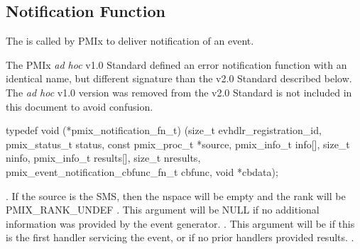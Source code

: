 \subsection{Notification Function}

\summary

The  is called by \ac{PMIx} to deliver notification of an event.

\adviceuserstart
The \ac{PMIx} \textit{ad hoc} v1.0 Standard defined an error notification function with an identical name, but different signature than the v2.0 Standard described below. The \textit{ad hoc} v1.0 version was removed from the v2.0 Standard is not included in this document to avoid confusion.
\adviceuserend


\cspecificstart
\begin{codepar}
typedef void (*pmix_notification_fn_t)
    (size_t evhdlr_registration_id,
     pmix_status_t status,
     const pmix_proc_t *source,
     pmix_info_t info[], size_t ninfo,
     pmix_info_t results[], size_t nresults,
     pmix_event_notification_cbfunc_fn_t cbfunc,
     void *cbdata);
\end{codepar}
\cspecificend

\begin{arglist}
. If the source is the \ac{SMS}, then the nspace will be empty and the rank will be PMIX_RANK_UNDEF
. This argument will be NULL if no additional information was provided by the event generator.
. This argument will be  if this is the first handler servicing the event, or if no prior handlers provided results.
.
\end{arglist}

